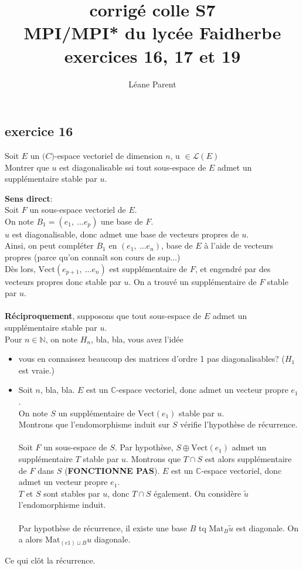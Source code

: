 \documentclass[a4paper,12pt]{article}
\title{ corrigé colle S7 \\
	MPI/MPI* du lycée Faidherbe \\
	\large exercices 16, 17 et 19}
\author{Léane Parent}
\begin{document}
	
	\maketitle
	
	\subsection*{exercice 16}
	Soit $E$ un $\mathbb(C)$-espace vectoriel de dimension $n$, u $\in \mathcal L(E)$ \\
	Montrer que $u$ est diagonalisable ssi tout sous-espace de $E$ admet un supplémentaire stable par $u$.
	\begin{correctionbox}
		\textbf{Sens direct}: \\
		Soit $F$ un sous-espace vectoriel de $E$. \\
		On note $B_1=(e_1,\ \dots e_p)$ une base de $F$. \\
		$u$ est diagonalisable, donc admet une base de vecteurs propres de $u$. \\
		Ainsi, on peut compléter $B_1$ en $(e_1, \ \dots e_n)$, base de $E$ à l'aide de vecteurs propres (parce qu'on connaît son cours de sup...) \\ Dès lors, $\mathrm{Vect}(e_{p+1}, \ \dots e_n)$ est supplémentaire de $F$, et engendré par des vecteurs propres donc stable par $u$. On a trouvé un supplémentaire de $F$ stable par $u$.
		\\ \\
		\textbf{Réciproquement}, supposons que tout sous-espace de $E$ admet un supplémentaire stable par $u$. \\
		Pour $n \in \mathbb{N}$, on note $H_n$, bla, bla, vous avez l'idée
		\begin{itemize}
			\item vous en connaissez beaucoup des matrices d'ordre 1 pas diagonalisables? ($H_1$ est vraie.)
			\item Soit $n$, bla, bla.
			$E$ est un $\mathbb{C}$-espace vectoriel, donc admet un vecteur propre $e_1$. \\
			On note $S$ un supplémentaire de $\mathrm{Vect}(e_1)$ stable par $u$. \\  Montrons que l'endomorphisme induit sur $S$ vérifie l'hypothèse de récurrence. \\ \\
			Soit $F$ un sous-espace de $S$. Par hypothèse, $S \oplus \mathrm{Vect}(e_1)$ admet un supplémentaire $T$ stable par $u$. Montrons que $T \cap S$ est alors supplémentaire  de $F$ dans $S$ (\textbf{FONCTIONNE PAS}). $E$ est un $\mathbb{C}$-espace vectoriel, donc admet un vecteur propre $e_1$. \\
			$T$ et $S$ sont stables par $u$, donc $T \cap S$ également. On considère $\tilde u$ l'endomorphisme induit. \\ \\
			Par hypothèse de récurrence, il existe une base $B$ tq $\mathrm{Mat}_B \tilde u$ est diagonale. On a alors $\mathrm{Mat}_{(e1)\sqcup B}u$ diagonale.
		\end{itemize}
		Ce qui clôt la récurrence.
		
		
	\end{correctionbox}
	
\end{document}
